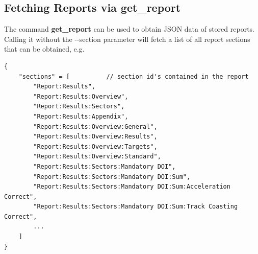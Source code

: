 




\subsection{Fetching Reports via get\_report}
\label{sec:get_report}

The command \textbf{get\_report} can be used to obtain JSON data of stored reports. \\

Calling it without the -{}-section parameter will fetch a list of all report sections that can be obtained, e.g.

\begin{lstlisting}[basicstyle=\tiny\ttfamily]
{
    "sections" = [          // section id's contained in the report
        "Report:Results",
        "Report:Results:Overview",
        "Report:Results:Sectors",
        "Report:Results:Appendix",
        "Report:Results:Overview:General",
        "Report:Results:Overview:Results",
        "Report:Results:Overview:Targets",
        "Report:Results:Overview:Standard",
        "Report:Results:Sectors:Mandatory DOI",
        "Report:Results:Sectors:Mandatory DOI:Sum",
        "Report:Results:Sectors:Mandatory DOI:Sum:Acceleration Correct",
        "Report:Results:Sectors:Mandatory DOI:Sum:Track Coasting Correct",
        ...
    ]
}
\end{lstlisting}

